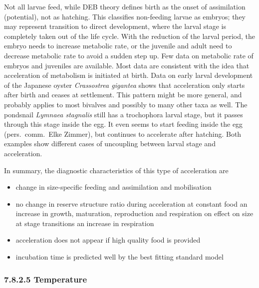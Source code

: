 Not all larvae feed, while DEB theory defines birth as the onset of assimilation (potential), not as hatching.
This classifies non-feeding larvae as embryos;
they may represent transition to direct development, where the larval stage is completely taken out of the life cycle.
With the reduction of the larval period, the embryo needs to increase metabolic rate, or the juvenile and adult need to decrease metabolic rate to avoid a sudden step up.
Few data on metabolic rate of embryos and juveniles are available.
Most data are consistent with the idea that acceleration of metabolism is initiated at birth.
Data on early larval development of the Japanese oyster \emph{Crassostrea gigantea} shows that acceleration only starts after birth and ceases at settlement.
This pattern might be more general, and probably applies to most bivalves and possibly to many other taxa as well.
The pondsnail \emph{Lymnaea stagnalis} still has a trochophora larval stage, but it passes through this stage inside the egg.
It even seems to start feeding inside the egg (pers.\ comm.\ Elke Zimmer), but continues to accelerate after hatching.
Both examples show different cases of uncoupling between larval stage and acceleration.

In summary, the diagnostic characteristics of this type of acceleration are
\begin{itemize}
  \item change in size-specific feeding and assimilation and mobilisation
	\item no change in reserve structure ratio during acceleration at constant food
		\subitem an increase in growth, maturation, reproduction and respiration
		\subitem on effect on  size at stage transitions
		\subitem an increase in respiration
	\item acceleration does not appear if high quality food is provided
	\item incubation time is predicted well by the best fitting standard model
\end{itemize}

\subsubsection*{7.8.2.5 Temperature}
{}
\label{sssec_c:acceleration_T}

